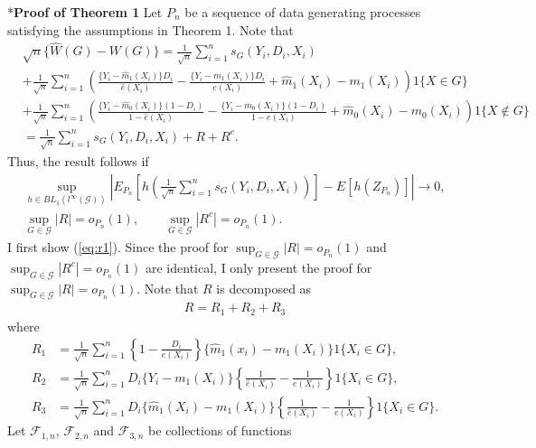 \documentclass[12pt,oneside,reqno,english]{amsart}
\makeatletter
\renewcommand\subsection{\@startsection{subsection}{2}%
  \z@{-.5\linespacing\@plus-.7\linespacing}{.5\linespacing}%
  {\normalfont\scshape}}
\theoremstyle{definition}
\makeatother
\begin{document}
\subsection*{\bf{Proof of Theorem 1}}
Let $P_{n}$ be a sequence of data generating processes satisfying the assumptions in Theorem 1. 
Note that 
\begin{align*}
&\sqrt{n}\{\hat{W}(G)-W(G)\}=\frac{1}{\sqrt{n}}\sum_{i=1}^{n}s_{G}(Y_{i},D_{i},X_{i})\\
&+\frac{1}{\sqrt{n}}\sum_{i=1}^{n}\left(\frac{\{Y_{i}-\hat{m}_{1}(X_{i})\}D_{i}}{\hat{e}(X_{i})}-\frac{\{Y_{i}-m_{1}(X_{i})\}D_{i}}{e(X_{i})}+\hat{m}_{1}(X_{i})
-m_{1}(X_{i})\right)1\{X\in G\}\\
&+
\frac{1}{\sqrt{n}}\sum_{i=1}^{n}\left(\frac{\{Y_{i}-\hat{m}_{0}(X_{i})\}(1-D_{i})}{1-\hat{e}(X_{i})}-\frac{\{Y_{i}-m_{0}(X_{i})\}(1-D_{i})}{1-e(X_{i})}+\hat{m}_{0}(X_{i})
-m_{0}(X_{i})\right)1\{X\not\in G\}\\
&=\frac{1}{\sqrt{n}}\sum_{i=1}^{n}s_{G}(Y_{i},D_{i},X_{i})+R+R^{c}.
\end{align*}
Thus, the result follows if 
\begin{align}
\sup_{h\in BL_{1}(l^{\infty}(\mathcal{G}))}\left|E_{P_{n}}\left[h\left(\frac{1}{\sqrt{n}}\sum_{i=1}^{n}s_{G}(Y_{i},D_{i},X_{i})\right)\right]-E[h(Z_{P_{n}})]\right|\rightarrow 0,\label{eq:asylin}\\
\sup_{G\in \mathcal{G}}|R|=o_{P_{n}}(1),\qquad \sup_{G\in \mathcal{G}}|R^{c}|=o_{P_{n}}(1).\label{eq:r1}
\end{align}
I first show (\ref{eq:r1}). 
Since the proof for $\sup_{G\in \mathcal{G}}|R|=o_{P_{n}}(1)$ and $\sup_{G\in \mathcal{G}}|R^{c}|=o_{P_{n}}(1)$
 are identical, I only present the proof for $\sup_{G\in \mathcal{G}}|R|=o_{P_{n}}(1)$. 
Note that $R$ is decomposed as 
\begin{align*}
R=R_{1}+R_{2}+R_{3}
\end{align*}
where 
\begin{align*}
R_{1}&= \frac{1}{\sqrt{n}}\sum_{i=1}^{n}\left\{1-\frac{D_{i}}{e(X_{i})}\right\}\{\hat{m}_{1}(x_{i})-m_{1}(X_{i})\}1\{X_{i}\in G\},\\
R_{2}&=\frac{1}{\sqrt{n}}\sum_{i=1}^{n}D_{i}\{Y_{i}-m_{1}(X_{i})\}\left\{\frac{1}{\hat{e}(X_{i})}-\frac{1}{e(X_{i})}\right\}1\{X_{i}\in G\},\\
R_{3}&=\frac{1}{\sqrt{n}}\sum_{i=1}^{n}D_{i}\{\hat{m}_{1}(X_{i})-m_{1}(X_{i})\}\left\{\frac{1}{\hat{e}(X_{i})}-\frac{1}{e(X_{i})}\right\}1\{X_{i}\in G\}.
\end{align*}
Let $\mathcal{F}_{1,n}$, $\mathcal{F}_{2,n}$ and $\mathcal{F}_{3,n}$ be collections of functions 
\end{document}
